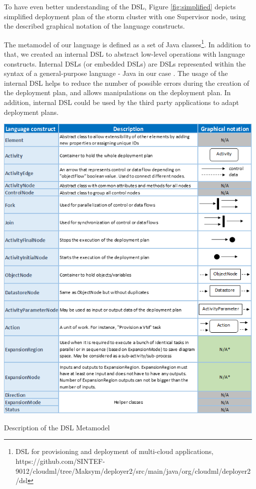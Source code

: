 \noindent To have even better understanding of the DSL, Figure \ref{fig:simplified} depicts simplified deployment plan of the storm cluster with one Supervisor node, using the described graphical notation of the language constructs.

\noindent The metamodel of our language is defined as a set of Java classes\footnote{ DSL for provisioning and deployment of multi-cloud applications, $  $https://github.com/SINTEF-9012/cloudml/tree/Maksym/deployer2/src/main/java/org/cloudml/deployer2/dsl}. In addition to that, we created an internal DSL to abstract low-level operations with language constructs. Internal DSLs (or embedded DSLs) are DSLs represented within the syntax of a general-purpose language - Java in our case \cite{fowler2010domain}. The usage of the internal DSL helps to reduce the number of possible errors during the creation of the deployment plan, and allows manipulations on the deployment plan. In addition, internal DSL could be used by the third party applications to adapt deployment plans. 

\begin{center}
	\includegraphics[width=38em]{./Figures/UML_table}
	\begin{table}[htbp]
    \caption{Description of the DSL Metamodel}
    \label{tab:2}
	\end{table}
\end{center} 

